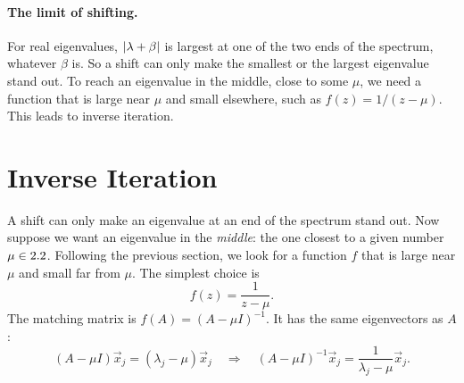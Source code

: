 \begin{center}
\end{center}

\paragraph{The limit of shifting.} For real eigenvalues, $\left\lvert \lambda + \beta \right\rvert$ is largest at one of the two ends of the spectrum, whatever $\beta$ is. So a shift can only make the smallest or the largest eigenvalue stand out. To reach an eigenvalue in the middle, close to some $\mu$, we need a function that is large near $\mu$ and small elsewhere, such as $f(z) = 1/(z - \mu)$. This leads to inverse iteration.

\section{Inverse Iteration}

A shift can only make an eigenvalue at an end of the spectrum stand out. Now suppose we want an eigenvalue in the \emph{middle}: the one closest to a given number $\mu \in 2.2$. Following the previous section, we look for a function $f$ that is large near $\mu$ and small far from $\mu$. The simplest choice is
\begin{equation}
  f(z) = \frac{1}{z - \mu}.
\end{equation}
The matching matrix is $f(A) = (A - \mu I)^{-1}$. It has the same eigenvectors as $A$:
\begin{equation*}
  (A - \mu I)\vec{x}_j = (\lambda_j - \mu)\vec{x}_j
  \quad \Longrightarrow \quad
  (A - \mu I)^{-1}\vec{x}_j = \frac{1}{\lambda_j - \mu}\vec{x}_j.
\end{equation*}

